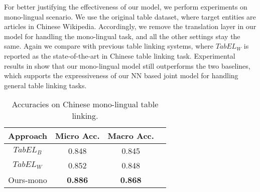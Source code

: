 
For better justifying the effectiveness of our model, we perform experiments on mono-lingual scenario.
We use the original table dataset, where target entities are articles in Chinese Wikipedia.
Accordingly, we remove the translation layer in our model for handling the mono-lingual task,
and all the other settings stay the same.
Again we compare with previous table linking systems,
where \textit{$TabEL_W$} is reported as the state-of-the-art in Chinese table linking task.
Experimental results in  show that
our mono-lingual model still outperforms the two baselines,
which supports the expressiveness of our NN based joint model for handling general table linking tasks.

\begin{table}[ht]
	\small
	\centering
	\caption{Accuracies on Chinese mono-lingual table linking.}
	\label{tab:mono-result}
	\begin{tabular} {c|c|cc}
        \hline
		Approach          & Micro Acc.   & Macro Acc.    \\
		\hline
		$TabEL_B$         &  0.848       & 0.845         \\
		$TabEL_W$         &  0.852       & 0.848         \\     
		Ours-mono  &  \textbf{0.886}       & \textbf{0.868}   \\
        \hline
	\end{tabular}
\end{table}
